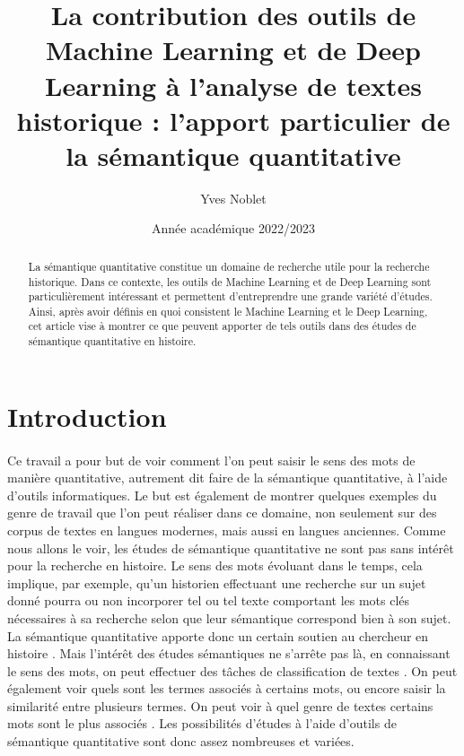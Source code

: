 \documentclass{article}
\title{La contribution des outils de Machine Learning et de Deep Learning à l’analyse de textes historique : l'apport particulier de la sémantique quantitative}
\author{Yves Noblet}
\date{Année académique 2022/2023}
\begin{document}
\maketitle
\begin{abstract}
    La sémantique quantitative constitue un domaine de recherche utile pour la recherche historique. Dans ce contexte, les outils de Machine Learning et de Deep Learning sont particulièrement intéressant et permettent d'entreprendre une grande variété d'études. Ainsi, après avoir définis en quoi consistent le Machine Learning et le Deep Learning, cet article vise à montrer ce que peuvent apporter de tels outils dans des études de sémantique quantitative en histoire. 
\end{abstract}
\section{Introduction}
\paragraph{}
Ce travail a pour but de voir comment l’on peut saisir le sens des mots de manière quantitative, autrement dit faire de la sémantique quantitative, à l’aide d’outils informatiques. Le but est également de montrer quelques exemples du genre de travail que l’on peut réaliser dans ce domaine, non seulement sur des corpus de textes en langues modernes, mais aussi en langues anciennes. Comme nous allons le voir, les études de sémantique quantitative ne sont pas sans intérêt pour la recherche en histoire. Le sens des mots évoluant dans le temps, cela implique, par exemple, qu’un historien effectuant une recherche sur un sujet donné pourra ou non incorporer tel ou tel texte comportant les mots clés nécessaires à sa recherche selon que leur sémantique correspond bien à son sujet. La sémantique quantitative apporte donc un certain soutien au chercheur en histoire \cite{liebeskind2020deep}. Mais l’intérêt des études sémantiques ne s’arrête pas là, en connaissant le sens des mots, on peut effectuer des tâches de classification de textes \cite{liebeskind2020deep}. On peut également voir quels sont les termes associés à certains mots, ou encore saisir la similarité entre plusieurs termes. On peut voir à quel genre de textes certains mots sont le plus associés \cite{perrone2019gasc}. Les possibilités d’études à l’aide d’outils de sémantique quantitative sont donc assez nombreuses et variées. 
\end{document}
